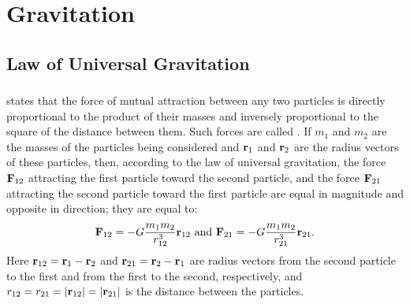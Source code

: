 
\chapter{Gravitation}
\label{ch-06}

\section{Law of Universal Gravitation}
\label{sec-6.1}
\subsection{}\label{6.1.1}  states that the force of mutual attraction between any two particles is directly proportional to the product of their masses and inversely pro­portional to the square of the distance between them. Such forces are called . If $m_{1}$ and $m_{2}$ are the masses of the particles being considered and $\vb{r}_{1}$ and $\vb{r}_{2}$ are the radius vectors of these particles, then, according to the law of univer­sal gravitation, the force $\vb{F}_{12}$ attracting the first particle toward the second particle, and the force $\vb{F}_{21}$ attracting the second particle toward the first particle are equal in magnitude and opposite in direction; they are equal to:
\begin{equation*}%
\vb{F}_{12} = -G \frac{m_{1}m_{2}}{r_{12}^{3}} \vb{r}_{12} \,\,\textrm{and}\,\,\vb{F}_{21} = -G \frac{m_{1}m_{2}}{r_{21}^{3}} \vb{r}_{21}.
\end{equation*}
Here $\vb{r}_{12} = \vb{r}_{1} - \vb{r}_{2}$ and $\vb{r}_{21}= \vb{r}_{2} - \vb{r}_{1}$ are radius vectors from the second particle to the first and from the first to the second, respectively, and $r_{12} = r_{21}= \abs{\vb{r}_{12}}= \abs{\vb{r}_{21}}$ is the distance between the particles. 

